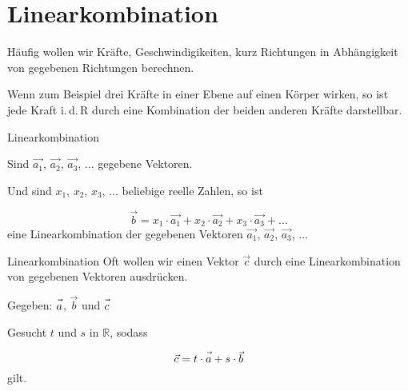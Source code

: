 \section{Linearkombination}


Häufig wollen wir Kräfte, Geschwindigikeiten, kurz Richtungen in
Abhängigkeit von gegebenen Richtungen berechnen.

Wenn zum Beispiel drei Kräfte in einer Ebene auf einen Körper wirken, so ist jede
Kraft i.\,d.\,R durch eine Kombination der beiden anderen Kräfte
darstellbar.

\begin{definition}{Linearkombination}{}

 
  Sind $\vec{a_1}$, $\vec{a_2}$, $\vec{a_3}$, ... gegebene Vektoren.

  Und sind $x_1$, $x_2$, $x_3$, ... beliebige reelle Zahlen, so ist

  $$\vec{b} = x_1\cdot{}\vec{a_1} +  x_2\cdot{}\vec{a_2} +
  x_3\cdot{}\vec{a_3} + ...$$
  eine Linearkombination der gegebenen Vektoren $\vec{a_1}$, $\vec{a_2}$, $\vec{a_3}$, ... 
\end{definition}




\begin{beispiel}{Linearkombination}{}
Oft wollen wir einen Vektor $\vec{c}$ durch eine Linearkombination von
gegebenen Vektoren ausdrücken.

Gegeben: $\vec{a\vphantom{b}}$, $\vec{b}$ und $\vec{c\vphantom{b}}$

Gesucht $t$ und $s$ in $\mathbb{R}$, sodass

$$\vec{c} = t\cdot{}\vec{a\vphantom{b}} + s\cdot{}\vec{b}$$
gilt.

\end{beispiel}

\newpage

